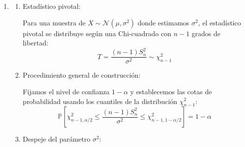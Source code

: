 \begin{enumerate}[label=\color{red}\textbf{\arabic*)}]
\begin{enumerate}[label=\color{red}\textbf{\alph*)}]
\begin{enumerate}[label=\arabic*)]
			                  Fijamos las cotas usando los cuantiles correspondientes a la distribución t: \[
				                  \mathbb{P}\left[ -t_{n_1+n_2-2,1-\alpha / 2}\le \dfrac{(\bar{X}-\bar{Y})-(\mu_1-\mu_2)}{S_p\sqrt{\frac{1}{n_1} +\frac{1}{n_2} } }\le t_{n_1+n_2-2,1-\alpha / 2} \right] =1-\alpha
			                  \]
			            \item Despeje del parámetro $(\mu_1-\mu_2)$: \[
				                  \begin{array}{c}
					                  \mathbb{P}\left[ -t_{n_1+n_2-2,1-\alpha / 2} S_p\sqrt{\frac{1}{n_1} +\frac{1}{n_2} }\le (\bar{X}-\bar{Y})-(\mu_1-\mu_2)\le t_{n_1+n_2-2,1-\alpha / 2} S_p\sqrt{\frac{1}{n_1} +\frac{1}{n_2} } \right] \\
					                  \mathbb{P}\left[ (\bar{X}-\bar{Y})-t_{n_1+n_2-2,1-\alpha / 2} S_p\sqrt{\frac{1}{n_1} +\frac{1}{n_2} }\le \mu_1-\mu_2\le (\bar{X}-\bar{Y})+t_{n_1+n_2-2,1-\alpha / 2} S_p\sqrt{\frac{1}{n_1} +\frac{1}{n_2} } \right]
				                  \end{array}
			                  \]
			            \item Intervalo de confianza final:

			                  Sustituyendo $S_p$ por su valor completo:  \[
				                  IC_{1-\alpha}(\mu_1-\mu_2)=\left( (\bar{X}-\bar{Y})\pm t_{n_1+n_2-2,1-\alpha / 2}\sqrt{\frac{(n_1-1)S_1^2+(n_2-1)S_2^2}{n_1+n_2-2} }\sqrt{\frac{1}{n_1}+\frac{1}{n_2}} \right)
			                  \]
		            \end{enumerate}
	      \end{enumerate}
	\item {}
	      \begin{enumerate}[label=\arabic*)]
		      \item Estadístico pivotal:

		            Para una muestra de $X\sim \mathcal{N}(\mu,\sigma^2)$ donde estimamos $\sigma^2$, el estadístico pivotal se distribuye según una Chi-cuadrado con $n-1$ grados de libertad: \[
			            T=\dfrac{(n-1)S_n^2}{\sigma^2}\sim \chi_{n-1}^2
		            \]
		      \item Procedimiento general de construcción:

		            Fijamos el nivel de confianza $1-\alpha$ y establecemos las cotas de probabilidad usando los cuantiles de la distribución $\chi_{n-1}^2$: \[
			            \mathbb{P}\left[ \chi_{n-1,\alpha /2}^2\le \dfrac{(n-1)S_n^2}{\sigma^2}\le \chi_{n-1,1-\alpha /2}^2 \right] =1-\alpha
		            \]
		      \item Despeje del parámetro $\sigma^2$:


\end{enumerate}
\end{enumerate}
